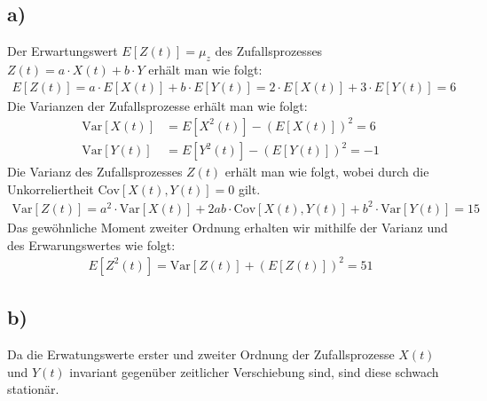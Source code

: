 \documentclass[11pt]{scrartcl} %
\begin{document}
\subsection*{a)}
Der Erwartungswert $E[Z(t)]=\mu_z$ des Zufallsprozesses $Z(t)=a\cdot X(t)+b\cdot Y$ erhält man wie folgt:
\begin{align*}
	E[Z(t)]=a\cdot E[X(t)]+b\cdot E[Y(t)]=2\cdot E[X(t)]+3\cdot E[Y(t)]=6
\end{align*}
Die Varianzen der Zufallsprozesse erhält man wie folgt:
\begin{align*}
	\text{Var}[X(t)]&=E[X^2(t)]-(E[X(t)])^2=6\\
	\text{Var}[Y(t)]&=E[Y^2(t)]-(E[Y(t)])^2=-1
\end{align*}
Die Varianz des Zufallsprozesses $Z(t)$ erhält man wie folgt, wobei durch die Unkorreliertheit $\text{Cov}[X(t),Y(t)]=0$ gilt.
\begin{align*}
\text{Var}[Z(t)]=a^2\cdot\text{Var}[X(t)]+2ab\cdot\text{Cov}[X(t),Y(t)]+b^2\cdot\text{Var}[Y(t)]=15
\end{align*}
Das gewöhnliche Moment zweiter Ordnung erhalten wir mithilfe der Varianz und des Erwarungswertes wie folgt:
\begin{align*}
		E[Z^2(t)]=\text{Var}[Z(t)]+(E[Z(t)])^2=51
\end{align*}
\subsection*{b)}
Da die Erwatungswerte erster und zweiter Ordnung der Zufallsprozesse $X(t)$ und $Y(t)$ invariant gegenüber zeitlicher Verschiebung sind, sind diese schwach stationär.
\end{document}
